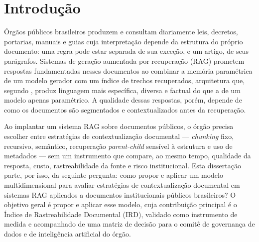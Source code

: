 
\section{Introdução}

Órgãos públicos brasileiros produzem e consultam diariamente leis, decretos, portarias,
manuais e guias cuja interpretação depende da estrutura do próprio documento:
uma regra pode estar separada de sua exceção, e um artigo, de seus parágrafos.
Sistemas de geração aumentada por recuperação (RAG) prometem respostas
fundamentadas nesses documentos ao combinar a memória paramétrica de um modelo
gerador com um índice de trechos recuperados, arquitetura que, segundo
, produz linguagem mais específica, diversa e factual
do que a de um modelo apenas paramétrico. A qualidade dessas respostas, porém,
depende de como os documentos são segmentados e contextualizados antes da
recuperação.

Ao implantar um sistema RAG sobre documentos públicos, o órgão precisa escolher
entre estratégias de contextualização documental --- \textit{chunking} fixo,
recursivo, semântico, recuperação \textit{parent-child} sensível à estrutura e
uso de metadados --- sem um instrumento que compare, ao mesmo tempo, qualidade
da resposta, custo, rastreabilidade da fonte e risco institucional. Esta
dissertação parte, por isso, da seguinte pergunta: como propor e aplicar um
modelo multidimensional para avaliar estratégias de contextualização documental
em sistemas RAG aplicados a documentos institucionais públicos brasileiros? O objetivo geral
é propor e aplicar esse modelo, cuja contribuição principal é o Índice de
Rastreabilidade Documental (IRD), validado como instrumento de medida e
acompanhado de uma matriz de decisão para o comitê de governança de dados e de
inteligência artificial do órgão.
